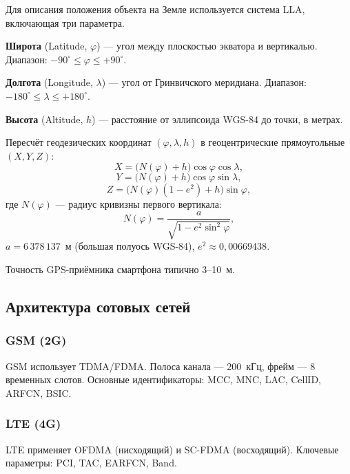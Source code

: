 \documentclass[a4paper,14pt,oneside,openany]{memoir}
\begin{document}
Для описания положения объекта на Земле используется система LLA,
включающая три параметра.

\textbf{Широта} (Latitude, $\varphi$) --- угол между плоскостью экватора
и вертикалью. Диапазон: $-90^{\circ} \leq \varphi \leq +90^{\circ}$.

\textbf{Долгота} (Longitude, $\lambda$) --- угол от Гринвичского меридиана.
Диапазон: $-180^{\circ} \leq \lambda \leq +180^{\circ}$.

\textbf{Высота} (Altitude, $h$) --- расстояние от эллипсоида WGS-84 до
точки, в метрах.

Пересчёт геодезических координат $(\varphi, \lambda, h)$ в геоцентрические
прямоугольные $(X, Y, Z)$:
\begin{equation}
  X = \bigl(N(\varphi) + h\bigr)\cos\varphi\cos\lambda,
\end{equation}
\begin{equation}
  Y = \bigl(N(\varphi) + h\bigr)\cos\varphi\sin\lambda,
\end{equation}
\begin{equation}
  Z = \bigl(N(\varphi)(1-e^2) + h\bigr)\sin\varphi,
\end{equation}
где $N(\varphi)$ --- радиус кривизны первого вертикала:
\begin{equation}
  N(\varphi) = \frac{a}{\sqrt{1 - e^2\sin^2\varphi}},
\end{equation}
$a = 6\,378\,137$~м (большая полуось WGS-84), $e^2 \approx 0{,}00669438$.

Точность GPS-приёмника смартфона типично 3--10~м.

\subsection{Архитектура сотовых сетей}

\subsubsection{GSM (2G)}

GSM использует TDMA/FDMA. Полоса канала --- 200~кГц, фрейм --- 8 временных
слотов. Основные идентификаторы: MCC, MNC, LAC, CellID, ARFCN, BSIC.

\subsubsection{LTE (4G)}

LTE применяет OFDMA (нисходящий) и SC-FDMA (восходящий). Ключевые
параметры: PCI, TAC, EARFCN, Band.
\end{document}
